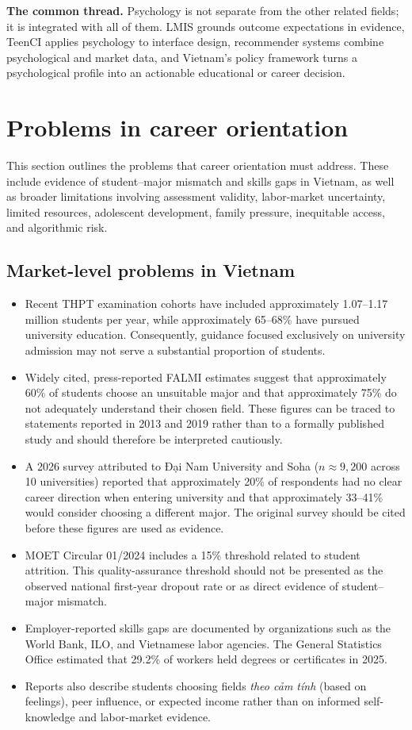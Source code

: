 \documentclass[a4paper]{article}
\begin{document}
\textbf{The common thread.} Psychology is not separate from the other related fields; it is integrated with all of them. LMIS grounds outcome expectations in evidence, TeenCI applies psychology to interface design, recommender systems combine psychological and market data, and Vietnam's policy framework turns a psychological profile into an actionable educational or career decision.

\section{Problems in career orientation}

This section outlines the problems that career orientation must address. These include evidence of student--major mismatch and skills gaps in Vietnam, as well as broader limitations involving assessment validity, labor-market uncertainty, limited resources, adolescent development, family pressure, inequitable access, and algorithmic risk.

\subsection{Market-level problems in Vietnam}
\begin{itemize}
    \item Recent THPT examination cohorts have included approximately 1.07--1.17 million students per year, while approximately 65--68\% have pursued university education. Consequently, guidance focused exclusively on university admission may not serve a substantial proportion of students.
    \item Widely cited, press-reported FALMI estimates suggest that approximately 60\% of students choose an unsuitable major and that approximately 75\% do not adequately understand their chosen field. These figures can be traced to statements reported in 2013 and 2019 rather than to a formally published study and should therefore be interpreted cautiously.
    \item A 2026 survey attributed to Đại Nam University and Soha ($n \approx 9{,}200$ across 10 universities) reported that approximately 20\% of respondents had no clear career direction when entering university and that approximately 33--41\% would consider choosing a different major. The original survey should be cited before these figures are used as evidence.
    \item MOET Circular 01/2024 includes a 15\% threshold related to student attrition. This quality-assurance threshold should not be presented as the observed national first-year dropout rate or as direct evidence of student--major mismatch.
    \item Employer-reported skills gaps are documented by organizations such as the World Bank, ILO, and Vietnamese labor agencies. The General Statistics Office estimated that 29.2\% of workers held degrees or certificates in 2025.
    \item Reports also describe students choosing fields \textit{theo cảm tính} (based on feelings), peer influence, or expected income rather than on informed self-knowledge and labor-market evidence.
\end{itemize}
\end{document}
